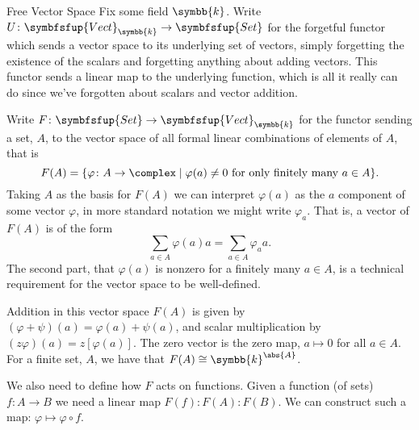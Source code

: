 \documentclass[fleqn]{NotesClass}
\makeatletter
\newcommand{\c@egory}[1]{\symbfsfup{#1}}
\newcommand{\Set}{\c@egory{Set}}
\renewcommand{\field}{\symbb{k}}
\newcommand{\Vect}[1][\field]{{\c@egory{Vect}_{#1}}}
\newcommand{\isomorphic}{\cong}
\makeatother
\begin{document}
\begin{appendices}
        \begin{exm}{Free Vector Space}{}
            Fix some field \(\field\).
            Write \(U \colon \Vect \to \Set\) for the forgetful functor which sends a vector space to its underlying set of vectors, simply forgetting the existence of the scalars and forgetting anything about adding vectors.
            This functor sends a linear map to the underlying function, which is all it really can do since we've forgotten about scalars and vector addition.
            
            Write \(F \colon \Set \to \Vect\) for the functor sending a set, \(A\), to the vector space of all formal linear combinations of elements of \(A\), that is
            \begin{equation}
                F(A) = \{\varphi \colon A \to \complex \mid \varphi(a) \ne 0 \text{ for only finitely many } a \in A\}.
            \end{equation}
            Taking \(A\) as the basis for \(F(A)\) we can interpret \(\varphi(a)\) as the \(a\) component of some vector \(\varphi\), in more standard notation we might write \(\varphi_a\).
            That is, a vector of \(F(A)\) is of the form
            \begin{equation}
                \sum_{a \in A} \varphi(a) a = \sum_{a \in A} \varphi_a a.
            \end{equation}
            The second part, that \(\varphi(a)\) is nonzero for a finitely many \(a \in A\), is a technical requirement for the vector space to be well-defined.
            
            Addition in this vector space \(F(A)\) is given by \((\varphi + \psi)(a) = \varphi(a) + \psi(a)\), and scalar multiplication by \((z\varphi)(a) = z[\varphi(a)]\).
            The zero vector is the zero map, \(a \mapsto 0\) for all \(a \in A\).
            For a finite set, \(A\), we have that \(F(A) \isomorphic \field^{\abs{A}}\).
            
            We also need to define how \(F\) acts on functions.
            Given a function (of sets) \(f \colon A \to B\) we need a linear map \(F(f) \colon F(A) \colon F(B)\).
            We can construct such a map: \(\varphi \mapsto \varphi \circ f\).
            

\end{exm}
\end{appendices}
\end{document}
